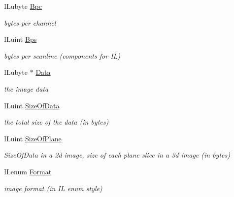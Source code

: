 \begin{DoxyCompactItemize}
\mbox{\label{structILimage_a20c53053c80d504de93c3ee17290a9ba}} 
I\+Lubyte \hyperlink{structILimage_a20c53053c80d504de93c3ee17290a9ba}{Bpc}
\begin{DoxyCompactList}\small\item\em bytes per channel \end{DoxyCompactList}\item 
\mbox{\label{structILimage_a09ee9478fab289cf2622f06db9171894}} 
I\+Luint \hyperlink{structILimage_a09ee9478fab289cf2622f06db9171894}{Bps}
\begin{DoxyCompactList}\small\item\em bytes per scanline (components for IL) \end{DoxyCompactList}\item 
\mbox{\label{structILimage_ab7a9627719d89abb3cb48087452acbc8}} 
I\+Lubyte $\ast$ \hyperlink{structILimage_ab7a9627719d89abb3cb48087452acbc8}{Data}
\begin{DoxyCompactList}\small\item\em the image data \end{DoxyCompactList}\item 
\mbox{\label{structILimage_a9e84436c94d9cd5afad59be12dff753b}} 
I\+Luint \hyperlink{structILimage_a9e84436c94d9cd5afad59be12dff753b}{Size\+Of\+Data}
\begin{DoxyCompactList}\small\item\em the total size of the data (in bytes) \end{DoxyCompactList}\item 
\mbox{\label{structILimage_a5ce85bc0b983ddf0ed91b1ed98d9132a}} 
I\+Luint \hyperlink{structILimage_a5ce85bc0b983ddf0ed91b1ed98d9132a}{Size\+Of\+Plane}
\begin{DoxyCompactList}\small\item\em Size\+Of\+Data in a 2d image, size of each plane slice in a 3d image (in bytes) \end{DoxyCompactList}\item 
\mbox{\label{structILimage_af36941d08ffdd7ed7c42cdb11d2a5513}} 
I\+Lenum \hyperlink{structILimage_af36941d08ffdd7ed7c42cdb11d2a5513}{Format}
\begin{DoxyCompactList}\small\item\em image format (in IL enum style) \end{DoxyCompactList}\item 

\end{DoxyCompactItemize}
